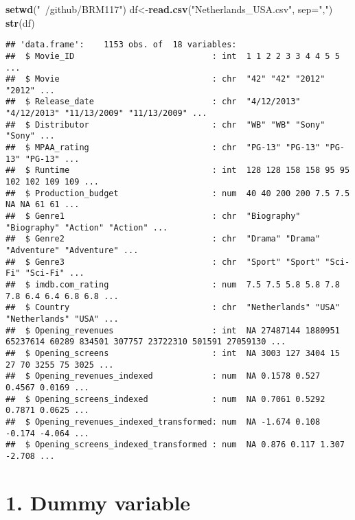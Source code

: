 \documentclass[
]{article}
\newenvironment{Shaded}{\begin{snugshade}}{\end{snugshade}}
\newcommand{\DataTypeTok}[1]{\textcolor[rgb]{0.13,0.29,0.53}{#1}}
\newcommand{\KeywordTok}[1]{\textcolor[rgb]{0.13,0.29,0.53}{\textbf{#1}}}
\newcommand{\NormalTok}[1]{#1}
\newcommand{\StringTok}[1]{\textcolor[rgb]{0.31,0.60,0.02}{#1}}
\begin{document}
\begin{Shaded}
\begin{Highlighting}[]
\KeywordTok{setwd}\NormalTok{(}\StringTok{"~/github/BRM117"}\NormalTok{)}
\NormalTok{df<-}\KeywordTok{read.csv}\NormalTok{(}\StringTok{"Netherlands_USA.csv"}\NormalTok{, }\DataTypeTok{sep=}\StringTok{","}\NormalTok{)}
\KeywordTok{str}\NormalTok{(df)}
\end{Highlighting}
\end{Shaded}

\begin{verbatim}
## 'data.frame':    1153 obs. of  18 variables:
##  $ Movie_ID                            : int  1 1 2 2 3 3 4 4 5 5 ...
##  $ Movie                               : chr  "42" "42" "2012" "2012" ...
##  $ Release_date                        : chr  "4/12/2013" "4/12/2013" "11/13/2009" "11/13/2009" ...
##  $ Distributor                         : chr  "WB" "WB" "Sony" "Sony" ...
##  $ MPAA_rating                         : chr  "PG-13" "PG-13" "PG-13" "PG-13" ...
##  $ Runtime                             : int  128 128 158 158 95 95 102 102 109 109 ...
##  $ Production_budget                   : num  40 40 200 200 7.5 7.5 NA NA 61 61 ...
##  $ Genre1                              : chr  "Biography" "Biography" "Action" "Action" ...
##  $ Genre2                              : chr  "Drama" "Drama" "Adventure" "Adventure" ...
##  $ Genre3                              : chr  "Sport" "Sport" "Sci-Fi" "Sci-Fi" ...
##  $ imdb.com_rating                     : num  7.5 7.5 5.8 5.8 7.8 7.8 6.4 6.4 6.8 6.8 ...
##  $ Country                             : chr  "Netherlands" "USA" "Netherlands" "USA" ...
##  $ Opening_revenues                    : int  NA 27487144 1880951 65237614 60289 834501 307757 23722310 501591 27059130 ...
##  $ Opening_screens                     : int  NA 3003 127 3404 15 27 70 3255 75 3025 ...
##  $ Opening_revenues_indexed            : num  NA 0.1578 0.527 0.4567 0.0169 ...
##  $ Opening_screens_indexed             : num  NA 0.7061 0.5292 0.7871 0.0625 ...
##  $ Opening_revenues_indexed_transformed: num  NA -1.674 0.108 -0.174 -4.064 ...
##  $ Opening_screens_indexed_transformed : num  NA 0.876 0.117 1.307 -2.708 ...
\end{verbatim}

\hypertarget{dummy-variable}{%
\section{1. Dummy variable}\label{dummy-variable}}
\end{document}
